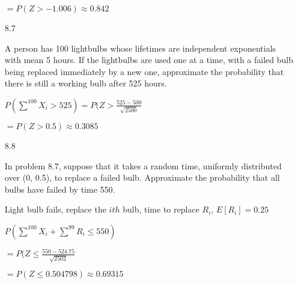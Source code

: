 \documentclass[11pt]{article}
\begin{document}
\begin{itemize}
		$=P(Z > -1.006) \approx 0.842$

	\item[8.7]

		A person has 100 lightbulbs whose lifetimes are 
		independent exponentials with mean 5 hours.
		If the lightbulbs are used one at a time, with
		a failed bulb being replaced immediately by a new one,
		approximate the probability that there is still a
		working bulb after 525 hours.

		$P(\sum^{100} X_i > 525) = P(Z > \frac{525-500}{
			\sqrt{2500}}$

		$= P(Z > 0.5) \approx 0.3085$

	\item[8.8]

		In problem 8.7, suppose that it takes a random time,
		uniformly distributed over (0, 0.5), to replace a 
		failed bulb. Approximate the probability that all bulbs
		have failed by time 550.

		Light bulb fails, replace the $ith$ bulb, time to replace $R_i$, $E[R_i] = 0.25$

		$P(\sum^{100} X_i + \sum^{99} R_i \leq 550)$

		$=P(Z \leq \frac{550-524.75}{\sqrt{2502}}$

		$=P(Z \leq 0.504798) \approx 0.69315$

\end{itemize}
\end{document}
